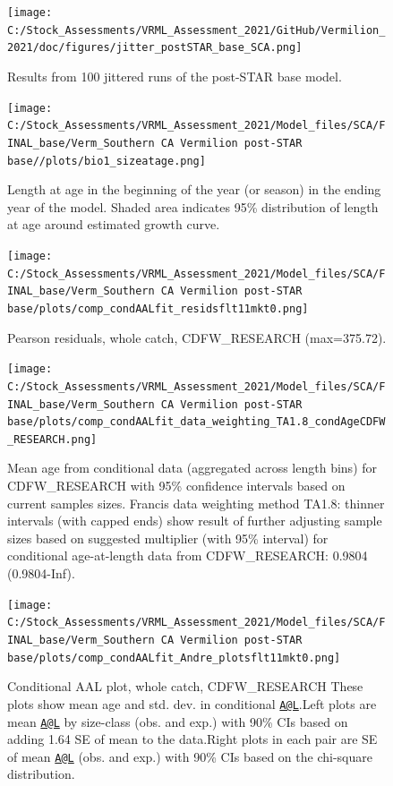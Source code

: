 \documentclass[11pt,
  english,
]{article}
\begin{document}
\begin{figure}
\centering
\texttt{[image: C:/Stock\_Assessments/VRML\_Assessment\_2021/GitHub/Vermilion\_2021/doc/figures/jitter\_postSTAR\_base\_SCA.png]}
\caption{Results from 100 jittered runs of the post-STAR base model.\label{fig:jitter}}
\end{figure}

\begin{figure}
\centering
\texttt{[image: C:/Stock\_Assessments/VRML\_Assessment\_2021/Model\_files/SCA/FINAL\_base/Verm\_Southern CA Vermilion post-STAR base//plots/bio1\_sizeatage.png]}
\caption{Length at age in the beginning of the year (or season) in the ending year of the model. Shaded area indicates 95\% distribution of length at age around estimated growth curve.\label{fig:fittedgrowth}}
\end{figure}

\FloatBarrier

\FloatBarrier

\begin{figure}
\centering
\texttt{[image: C:/Stock\_Assessments/VRML\_Assessment\_2021/Model\_files/SCA/FINAL\_base/Verm\_Southern CA Vermilion post-STAR base/plots/comp\_condAALfit\_residsflt11mkt0.png]}
\caption{Pearson residuals, whole catch, CDFW\_RESEARCH (max=375.72).\label{fig:comp_condAALfit_residsflt11mkt0}}
\end{figure}

\begin{figure}
\centering
\texttt{[image: C:/Stock\_Assessments/VRML\_Assessment\_2021/Model\_files/SCA/FINAL\_base/Verm\_Southern CA Vermilion post-STAR base/plots/comp\_condAALfit\_data\_weighting\_TA1.8\_condAgeCDFW\_RESEARCH.png]}
\caption{Mean age from conditional data (aggregated across length bins) for CDFW\_RESEARCH with 95\% confidence intervals based on current samples sizes. Francis data weighting method TA1.8: thinner intervals (with capped ends) show result of further adjusting sample sizes based on suggested multiplier (with 95\% interval) for conditional age-at-length data from CDFW\_RESEARCH: 0.9804 (0.9804-Inf).\label{fig:comp_condAALfit_data_weighting_TA1.8_condAgeCDFW_RESEARCH}}
\end{figure}

\begin{figure}
\centering
\texttt{[image: C:/Stock\_Assessments/VRML\_Assessment\_2021/Model\_files/SCA/FINAL\_base/Verm\_Southern CA Vermilion post-STAR base/plots/comp\_condAALfit\_Andre\_plotsflt11mkt0.png]}
\caption{Conditional AAL plot, whole catch, CDFW\_RESEARCH These plots show mean age and std. dev. in conditional {\href{mailto:A@L}{\nolinkurl{A@L}}\leavevmode\tagmcend\tagstructend}.Left plots are mean {\href{mailto:A@L}{\nolinkurl{A@L}}\leavevmode\tagmcend\tagstructend} by size-class (obs. and exp.) with 90\% CIs based on adding 1.64 SE of mean to the data.Right plots in each pair are SE of mean {\href{mailto:A@L}{\nolinkurl{A@L}}\leavevmode\tagmcend\tagstructend} (obs. and exp.) with 90\% CIs based on the chi-square distribution.\label{fig:comp_condAALfit_Andre_plotsflt11mkt0}}
\end{figure}
\end{document}

